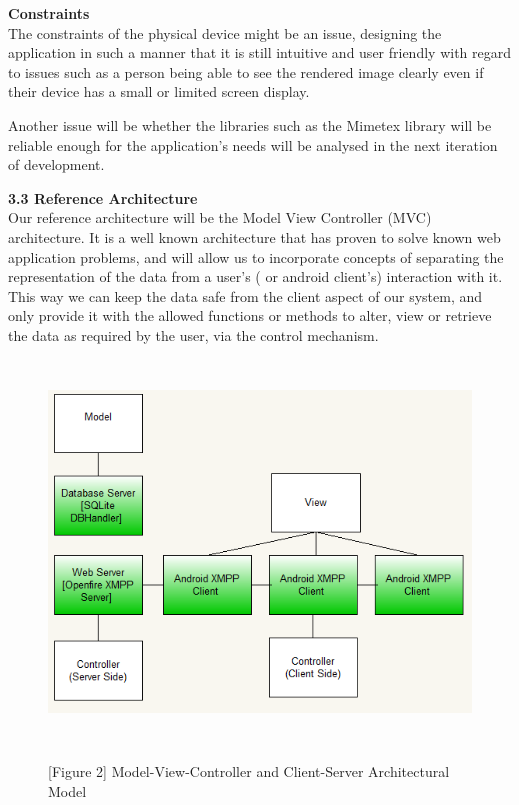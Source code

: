 \documentclass[29pt,a4paper]{moderncv}
\begin{document}
			
			\noindent\textbf{Constraints}
				\\The constraints of the physical device might be an issue, designing the application in such a manner that it is still intuitive and user friendly with regard to issues such as a person being able to see the rendered image clearly even if their device has a small or limited screen display.
				
				Another issue will be whether the libraries such as the Mimetex library will be reliable enough for the application's needs will be analysed in the next iteration of development.
		\vspace{5mm}
		
		\noindent \textbf{3.3 Reference Architecture}
			\\Our reference architecture will be the Model View Controller (MVC) architecture. It is a well known architecture that has proven to solve known web application problems, and will allow us to incorporate concepts of separating the representation of the data from a user’s ( or android client’s) interaction with it.  This way we can keep the data safe from the client aspect of our system, and only provide it with the allowed functions or methods to alter, view or retrieve the data as required by the user, via the control mechanism.\\
			
			\noindent\begin{figure}
							\centering
							\includegraphics[width=5.5in, height=4.0in]{./OverallArchitecture.png}
							\\\caption{[Figure 2] Model-View-Controller and Client-Server Architectural Model}
							\end{figure}
			
\end{document}
